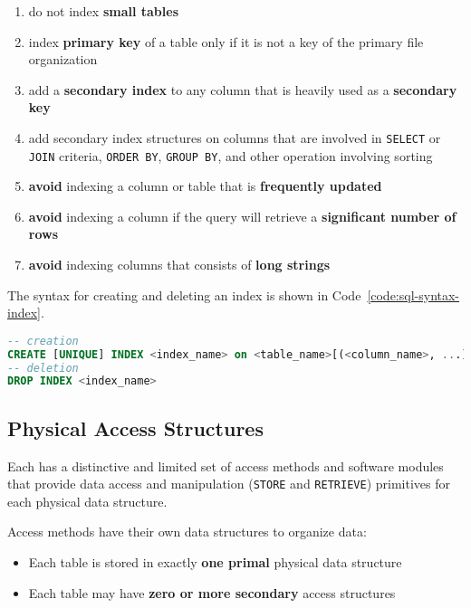 \documentclass[english]{article}
\begin{document}
\begin{enumerate}
  \item do not index \textbf{small tables}
  \item index \textbf{primary key }of a table only if it is not a key of the primary file organization
  \item add a \textbf{secondary index} to any column that is heavily used as a \textbf{secondary key}
  \item add secondary index structures on columns that are involved in \texttt{SELECT} or \texttt{JOIN} criteria, \texttt{ORDER BY}, \texttt{GROUP BY}, and other operation involving sorting
  \item \textbf{avoid} indexing a column or table that is \textbf{frequently updated}
  \item \textbf{avoid} indexing a column if the query will retrieve a \textbf{significant number of rows}
  \item \textbf{avoid} indexing columns that consists of \textbf{long strings}
\end{enumerate}

The \sql syntax for creating and deleting an index is shown in Code~\ref{code:sql-syntax-index}.

\begin{lstlisting}[language=SQL, caption={\sql syntax for creating and deleting an index}, label={code:sql-syntax-index}]
-- creation
CREATE [UNIQUE] INDEX <index_name> on <table_name>[(<column_name>, ...)]
-- deletion
DROP INDEX <index_name>
\end{lstlisting}

\subsection{Physical Access Structures}

Each \dbms has a distinctive and limited set of access methods and software modules that provide data access and manipulation (\texttt{STORE} and \texttt{RETRIEVE}) primitives for each physical data structure.

Access methods have their own data structures to organize data:

\begin{itemize}
  \item Each table is stored in exactly \textbf{one primal} physical data structure
  \item Each table may have \textbf{zero or more secondary} access structures
\end{itemize}
\end{document}
